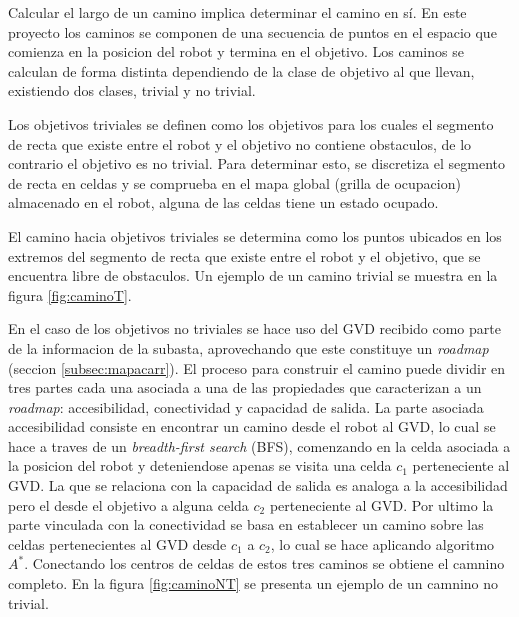 Calcular el largo de un camino implica determinar el camino en sí. En este
proyecto los caminos se componen de una secuencia de puntos en el espacio que
comienza en la posicion del robot y termina en el objetivo. Los caminos se
calculan de forma distinta dependiendo de la clase de objetivo al que llevan,
existiendo dos clases, trivial y no trivial.

Los objetivos triviales se definen como los objetivos para los cuales el
segmento de recta que existe entre el robot y el objetivo no contiene
obstaculos, de lo contrario el objetivo es no trivial. Para determinar esto, se
discretiza el segmento de recta en celdas \cite{foleyphillips} y se comprueba
en el mapa global (grilla de ocupacion) almacenado en el robot, alguna de las
celdas tiene un estado ocupado. 

El camino hacia objetivos triviales se determina como los puntos ubicados en
los extremos del segmento de recta que existe entre el robot y el objetivo, que
se encuentra libre de obstaculos. Un ejemplo de un camino trivial se muestra
en la figura \ref{fig:caminoT}.

En el caso de los objetivos no triviales se hace uso del GVD recibido como
parte de la informacion de la subasta, aprovechando que este constituye un
\emph{roadmap} (seccion \ref{subsec:mapacarr}). El proceso para construir el
camino puede dividir en tres partes cada una asociada a una de las propiedades
que caracterizan a un \emph{roadmap}: accesibilidad, conectividad y capacidad
de salida. La parte asociada accesibilidad consiste en encontrar un camino
desde el robot al GVD, lo cual se hace a traves de un \emph{breadth-first
search} (BFS), comenzando en la celda asociada a la posicion del robot y
deteniendose apenas se visita una celda $c_1$ perteneciente al GVD. La que se
relaciona con la capacidad de salida es analoga a la accesibilidad pero el
desde el objetivo a alguna celda $c_2$ perteneciente al GVD. Por ultimo la parte
vinculada con la conectividad se basa en establecer un camino sobre las celdas
pertenecientes al GVD desde $c_1$ a $c_2$, lo cual se hace aplicando algoritmo
$A^*$. Conectando los centros de celdas de estos tres caminos se obtiene el
camnino completo. En la figura \ref{fig:caminoNT} se presenta un ejemplo de un
camnino no trivial.

